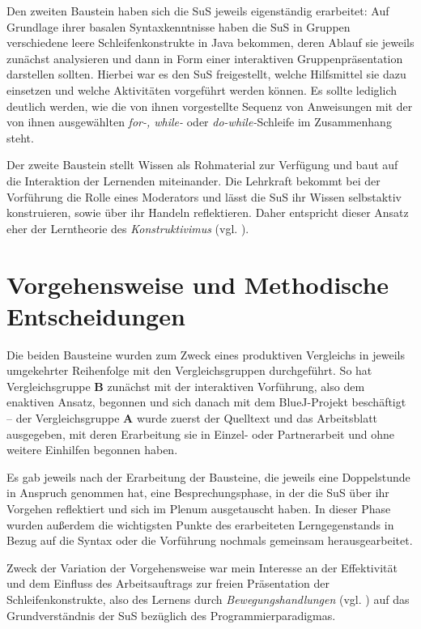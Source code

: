 \documentclass[paper=a4, DIV=13, BCOR=8mm, oneside=on, onecolumn=on, open = any, titlepage =on, parskip =half-, headsepline = on, footsepline = off, chapterprefix = on, sectionprefix = on, appendixprefix = off, fontsize = 12pt, numbers = noenddot, abstract = off]{scrreprt}
\begin{document}
Den zweiten Baustein haben sich die SuS jeweils eigenständig erarbeitet: Auf Grundlage ihrer basalen Syntaxkenntnisse haben die SuS in Gruppen verschiedene leere Schleifenkonstrukte in Java bekommen, deren Ablauf sie jeweils zunächst analysieren und dann in Form einer interaktiven Gruppenpräsentation darstellen sollten. Hierbei war es den SuS freigestellt, welche Hilfsmittel sie dazu einsetzen und welche Aktivitäten vorgeführt werden können. Es sollte lediglich deutlich werden, wie die von ihnen vorgestellte Sequenz von Anweisungen mit der von ihnen ausgewählten \emph{for-, while-} oder \emph{do-while-}Schleife im Zusammenhang steht.

Der zweite Baustein stellt Wissen als Rohmaterial zur Verfügung und baut auf die Interaktion der Lernenden miteinander. Die Lehrkraft bekommt bei der Vorführung die Rolle eines Moderators und lässt die SuS ihr Wissen selbstaktiv konstruieren, sowie über ihr Handeln reflektieren. Daher entspricht dieser Ansatz eher der Lerntheorie des \emph{Konstruktivimus} (vgl. \cite[S.219]{schwarzer:07}).

\newpage
\par \singlespacing
 \section{Vorgehensweise und Methodische Entscheidungen}
 \label{sec:vorgehensweisen}
\onehalfspacing
\enlargethispage{2ex}
Die beiden Bausteine wurden zum Zweck eines produktiven Vergleichs in jeweils umgekehrter Reihenfolge mit den Vergleichsgruppen durchgeführt. So hat Vergleichsgruppe \textsc{\textbf{B}} zunächst mit der interaktiven Vorführung, also dem enaktiven Ansatz, begonnen und sich danach mit dem BlueJ-Projekt beschäftigt -- der Vergleichsgruppe \textsc{\textbf{A}} wurde zuerst der Quelltext und das Arbeitsblatt ausgegeben, mit deren Erarbeitung sie in Einzel- oder Partnerarbeit und ohne weitere Einhilfen begonnen haben. 

Es gab jeweils nach der Erarbeitung der Bausteine, die jeweils eine Doppelstunde in Anspruch genommen hat, eine Besprechungsphase, in der die SuS über ihr Vorgehen reflektiert und sich im Plenum ausgetauscht haben. In dieser Phase wurden außerdem die wichtigsten Punkte des erarbeiteten Lerngegenstands in Bezug auf die Syntax oder die Vorführung nochmals gemeinsam herausgearbeitet.

Zweck der Variation der Vorgehensweise war mein Interesse an der Effektivität und dem Einfluss des Arbeitsauftrags zur freien Präsentation der Schleifenkonstrukte, also des Lernens durch \emph{Bewegungshandlungen} (vgl. \cite[S.183f.]{aebli:11}) auf das Grundverständnis der SuS bezüglich des Programmierparadigmas. 
\end{document}

